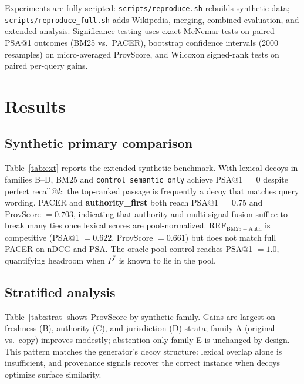 \documentclass[sigconf,anonymous,review]{acmart}
\begin{document}
Experiments are fully scripted: \texttt{scripts/reproduce.sh} rebuilds synthetic data; \texttt{scripts/reproduce\_full.sh} adds Wikipedia, merging, combined evaluation, and extended analysis.
Significance testing uses exact McNemar tests on paired PSA@1 outcomes (BM25 vs.\ PACER), bootstrap confidence intervals (2000 resamples) on micro-averaged ProvScore, and Wilcoxon signed-rank tests on paired per-query gains.

\section{Results}
\label{sec:results}

\subsection{Synthetic primary comparison}
Table~\ref{tab:ext} reports the extended synthetic benchmark.
With lexical decoys in families B--D, BM25 and \texttt{control\_semantic\_only} achieve PSA@1 $=0$ despite perfect recall@$k$: the top-ranked passage is frequently a decoy that matches query wording.
PACER and \textbf{authority\_first} both reach PSA@1 $=0.75$ and ProvScore $=0.703$, indicating that authority and multi-signal fusion suffice to break many ties once lexical scores are pool-normalized.
RRF$_{\mathrm{BM25+Auth}}$ is competitive (PSA@1 $=0.622$, ProvScore $=0.661$) but does not match full PACER on nDCG and PSA.
The oracle pool control reaches PSA@1 $=1.0$, quantifying headroom when $P^\ast$ is known to lie in the pool.

\begin{table}[t]
  \centering
  \caption{Synthetic ProvBench-RAG extended comparison ($n{=}$\ProvBenchNumQueries{}). Prov.F1: macro provenance F1@3 on queries with $P^\ast$.}
  \label{tab:ext}
\end{table}

\subsection{Stratified analysis}
Table~\ref{tab:strat} shows ProvScore by synthetic family.
Gains are largest on freshness (B), authority (C), and jurisdiction (D) strata; family A (original vs.\ copy) improves modestly; abstention-only family E is unchanged by design.
This pattern matches the generator's decoy structure: lexical overlap alone is insufficient, and provenance signals recover the correct instance when decoys optimize surface similarity.
\end{document}
